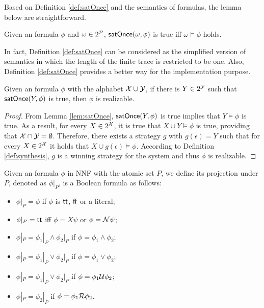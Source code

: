 Based on Definition \ref{def:satOnce} and the semantics of \ltlf formulas, the lemma below are straightforward. 

\begin{lemma}\label{lem:satOnce}
Given an \ltlf formula $\phi$ and $\omega\in 2^{\P}$, $\satOnce (\omega, \phi)$ is true iff $\omega\models\phi$ holds.
\end{lemma}
In fact, Definition \ref{def:satOnce} can be considered as the simplified version of \ltlf semantics in which the length of the finite trace is restricted to be one. Also, Definition \ref{def:satOnce} provides a better way for the implementation purpose. 

\begin{lemma}
Given an \ltlf formula $\phi$ with the alphabet $\X\cup \Y$, if there is $Y\in 2^{\Y}$ such that $\satOnce (Y, \phi)$ is true, then $\phi$ is realizable. 
\end{lemma}
\begin{proof}
From Lemma \ref{lem:satOnce}, $\satOnce (Y, \phi)$ is true implies that $Y\models\phi$ is true. As a result, for every $X\in 2^{\X}$, it is true that $X\cup Y\models\phi$ is true, providing that $\X\cap \Y=\emptyset$. Therefore, there exists a strategy $g$ with $g(\epsilon) = Y$ such that for every $X\in 2^{\X}$ it holds that $X\cup g(\epsilon)\models\phi$. According to Definition \ref{def:synthesis}, $g$ is a winning strategy for the system and thus $\phi$ is realizable.
\end{proof}

\begin{definition}\label{def:fp}
Given an \ltlf formula $\phi$ in NNF with the atomic set $P$, we define its projection under $P$, denoted as $\phi |_P$, is a Boolean formula as follows:
\begin{itemize}
	\item $\phi|_P = \phi$ if $\phi$ is $\tt$, $\ff$ or a literal;
	\item $\phi|_P = \tt$ iff $\phi = X\psi$ or $\phi = \N\psi$;
	\item $\phi|_P = \phi_1|_P \wedge \phi_2|_P$ if $\phi = \phi_1\wedge\phi_2$;
	\item $\phi|_P = \phi_1|_P \vee \phi_2|_P$ if $\phi = \phi_1\vee\phi_2$;
	\item $\phi|_P = \phi_1|_P \vee \phi_2|_P$ if $\phi = \phi_1\U\phi_2$;
	\item $\phi|_P = \phi_2|_P$ if $\phi = \phi_1\R\phi_2$.
\end{itemize}
\end{definition}

